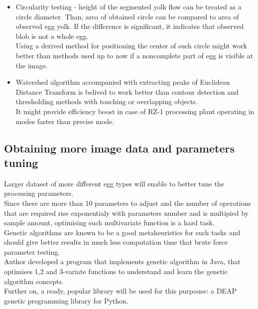 \documentclass[12pt,twoside,a4paper]{article}
\begin{document}
\begin{itemize}
\item Circularity testing - height of the segmented yolk flow can be treated as a circle diameter. Than, area of obtained circle can be compared to area of observed egg yolk. If the difference is significant, it indicates that observed blob is not a whole egg.\\
Using a derived method for positioning the center of such circle might work better than methods used up to now if a noncomplete part of egg is visible at the image.
\item Watershed algorithm accompanied with extracting peaks of Euclidean Distance Transform is belived to work better than contour detection and thresholding methods with touching or overlapping objects.\\
It might provide efficiency boost in case of RZ-1 processing plant operating in modes faster than precise mode.\cite{watershed}
\end{itemize}

\subsection{Obtaining more image data and parameters tuning}

Larger dataset of more different egg types will enable to better tune the processing parameters.\\
Since there are more than 10 parameters to adjust and the number of operations that are required rise exponentialy with parameters number and is multipied by sample amount, optimising such multivariate function is a hard task.\\
Genetic algorithms are known to be a good metaheuristics for such tasks and should give better results in much less computation time that brute force parameter testing.\\
Author developed a program that implements genetic algorithm in Java, that optimises 1,2 and 3-variate functions to understand and learn the genetic algorithm concepts.\\
Further on, a ready, popular library will be used for this purpouse: a DEAP genetic programming library for Python.
\end{document}
